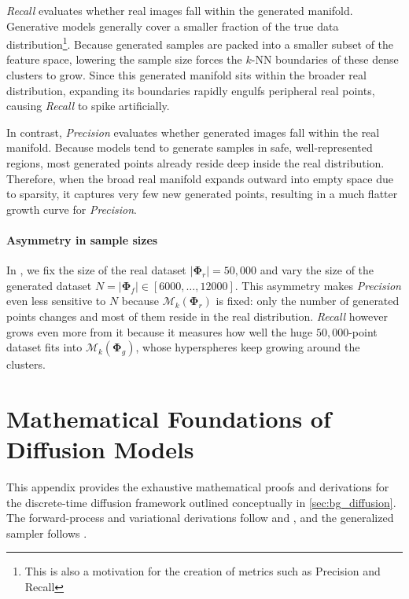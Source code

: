 \emph{Recall} evaluates whether real images fall within the generated manifold.
Generative models generally cover a smaller fraction of the true data distribution\footnote{This is also a motivation for the creation of metrics such as Precision and Recall}. Because generated samples are packed into a smaller subset of the feature space, lowering the sample size forces the $k$-NN boundaries of these dense clusters to grow. Since this generated manifold sits within the broader real distribution, expanding its boundaries rapidly engulfs peripheral real points, causing \emph{Recall} to spike artificially. 

In contrast, \emph{Precision} evaluates whether generated images fall within the real manifold. Because models tend to generate samples in safe, well-represented regions, most generated points already reside deep inside the real distribution. Therefore, when the broad real manifold expands outward into empty space due to sparsity, it captures very few new generated points, resulting in a much flatter growth curve for \emph{Precision}.

\paragraph{Asymmetry in sample sizes}
In \cite{jazbec_generative_2025}, we fix the size of the real dataset $|\boldsymbol{\Phi}_r| = 50{,}000$ and vary the size of the generated dataset $N = |\boldsymbol\Phi_f| \in [6000,\dots,12000]$. This asymmetry makes \emph{Precision} even less sensitive to $N$ because $\mathcal{M}_k(\boldsymbol\Phi_r)$ is fixed: only the number of generated points changes and most of them reside in the real distribution. \emph{Recall} however grows even more from it because it measures how well the huge $50{,}000$-point dataset fits into $\mathcal{M}_k(\boldsymbol\Phi_g)$, whose hyperspheres keep growing around the clusters.

\section{Mathematical Foundations of Diffusion Models}
\label{app:diffusion_math}


This appendix provides the exhaustive mathematical proofs and derivations for the discrete-time diffusion framework outlined conceptually in \autoref{sec:bg_diffusion}. The forward-process and variational derivations follow \textcite{sohl2015thermo} and \textcite{ho_denoising_2020}, and the generalized sampler follows \textcite{song_denoising_2022}.

